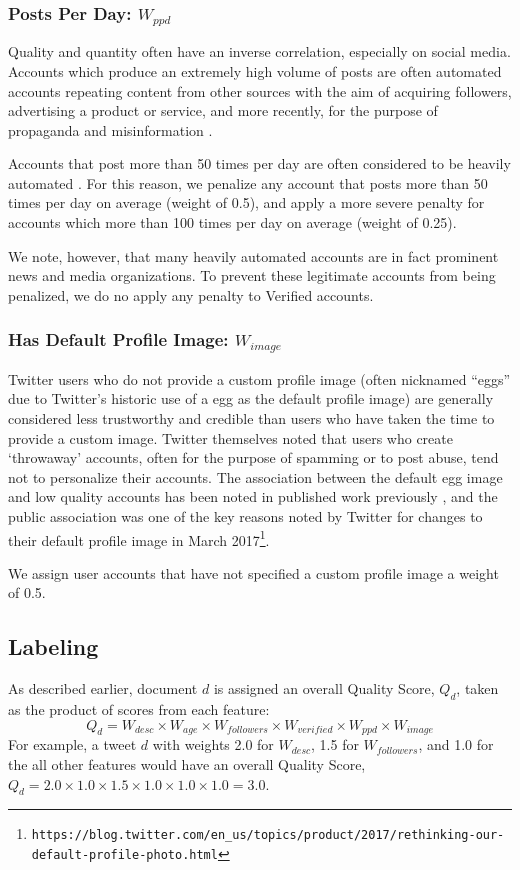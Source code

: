 \subsubsection{Posts Per Day: \(W_{ppd}\)}
Quality and quantity often have an inverse correlation, especially on social media.
Accounts which produce an extremely high volume of posts are often automated accounts repeating content from other sources with the aim of acquiring followers, advertising a product or service, and more recently, for the purpose of propaganda and misinformation \citep{Forelle15, Howard16}.

Accounts that post more than 50 times per day are often considered to be heavily automated \citep{Howard16}. For this reason, we penalize any account that posts more than 50 times per day on average (weight of 0.5), and apply a more severe penalty for accounts which more than 100 times per day on average (weight of 0.25).

We note, however, that many heavily automated accounts are in fact prominent news and media organizations. To prevent these legitimate accounts from being penalized, we do no apply any penalty to Verified accounts.

\subsubsection{Has Default Profile Image: \(W_{image}\)}
Twitter users who do not provide a custom profile image (often nicknamed ``eggs'' due to Twitter's historic use of a egg as the default profile image) are generally considered less trustworthy and credible \citep{Castillo11,Sikdar13, Gun14} than users who have taken the time to provide a custom image.
Twitter themselves noted that users who create `throwaway' accounts, often for the purpose of spamming or to post abuse, tend not to personalize their accounts.
The association between the default egg image and low quality accounts has been noted in published work previously \citep{Sikdar13}, and the public association was one of the key reasons noted by Twitter for changes to their default profile image in March 2017\footnote{\texttt{https://blog.twitter.com/en\_us/topics/product/2017/rethinking-our-\\default-profile-photo.html}}.

We assign user accounts that have not specified a custom profile image a weight of 0.5.

\subsection{Labeling}
As described earlier, document \(d\) is assigned an overall Quality Score, \(Q_d\), taken as the product of scores from each feature:
\begin{equation}
	Q_d = W_{desc} \times W_{age} \times W_{followers} \times W_{verified} \times W_{ppd} \times W_{image}
\end{equation}
For example, a tweet \(d\) with weights 2.0 for \(W_{desc}\), 1.5 for \(W_{followers}\), and 1.0 for the all other features would have an overall Quality Score, \(
	Q_d =  2.0 \times 1.0 \times 1.5 \times 1.0 \times 1.0  \times 1.0 = 3.0 \).

